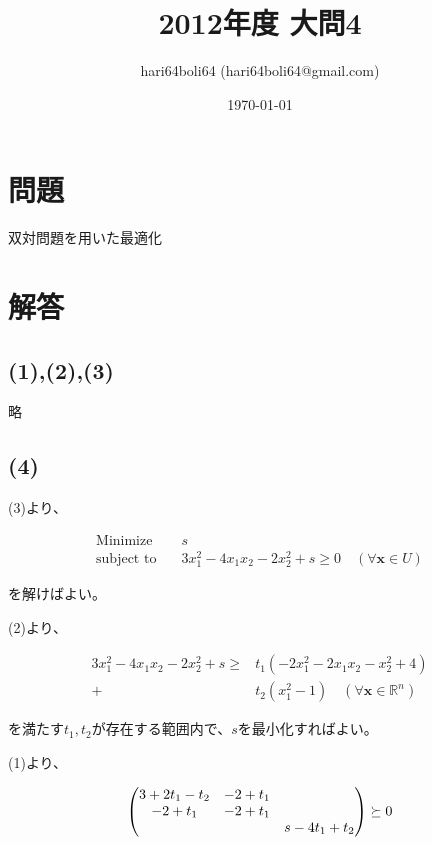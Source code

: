 \documentclass[a4paper, 10pt, dvipdfmx]{jlreq}
\begin{document}
\title{2012年度 大問4}
\author{hari64boli64 (hari64boli64@gmail.com)}
\date{\today}
\maketitle

\section{問題}

双対問題を用いた最適化

\section{解答}

\subsection*{(1),(2),(3)}

略

\subsection*{(4)}

(3)より、

\begin{align*}
  \text{Minimize} \quad   & s                                                           \\
  \text{subject to} \quad & 3x_1^2-4x_1x_2-2x_2^2+s \geq 0 \quad (\forall \bm{x} \in U)
\end{align*}

を解けばよい。

(2)より、

\begin{align*}
  3x_1^2-4x_1x_2-2x_2^2+s \geq & t_1(-2x_1^2-2x_1x_2-x_2^2+4)                         \\
  +                            & t_2(x_1^2-1) \quad (\forall \bm{x} \in \mathbb{R}^n)
\end{align*}

を満たす$t_1,t_2$が存在する範囲内で、$s$を最小化すればよい。

(1)より、

\begin{align*}
  \mqty(
  3+2t_1-t_2 & -2+t_1 &            \\
  -2+t_1     & -2+t_1 &            \\
             &        & s-4t_1+t_2
  ) \succeq 0
\end{align*}
\end{document}
